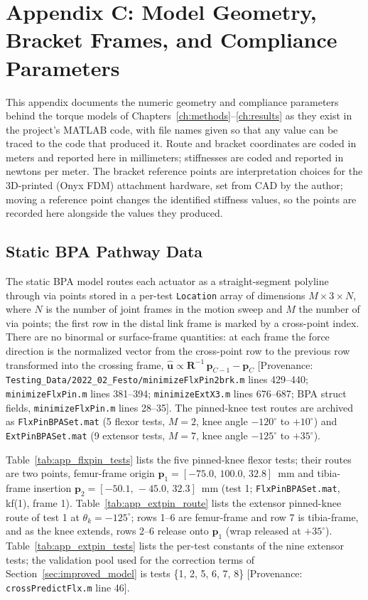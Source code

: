 \chapter{Appendix C: Model Geometry, Bracket Frames, and Compliance Parameters}\label{app:model_geometry}

This appendix documents the numeric geometry and compliance parameters behind the torque models of Chapters~\ref{ch:methods}--\ref{ch:results} as they exist in the project's MATLAB code, with file names given so that any value can be traced to the code that produced it. Route and bracket coordinates are coded in meters and reported here in millimeters; stiffnesses are coded and reported in newtons per meter. The bracket reference points are interpretation choices for the 3D-printed (Onyx FDM) attachment hardware, set from CAD by the author; moving a reference point changes the identified stiffness values, so the points are recorded here alongside the values they produced.

\section{Static BPA Pathway Data}

The static BPA model routes each actuator as a straight-segment polyline through via points stored in a per-test \texttt{Location} array of dimensions $M\times3\times N$, where $N$ is the number of joint frames in the motion sweep and $M$ the number of via points; the first row in the distal link frame is marked by a cross-point index. There are no binormal or surface-frame quantities: at each frame the force direction is the normalized vector from the cross-point row to the previous row transformed into the crossing frame, $\hat{\mathbf{u}} \propto \mathbf{R}^{-1}\,\mathbf{p}_{C-1} - \mathbf{p}_{C}$ [Provenance: \texttt{Testing\_Data/2022\_02\_Festo/minimizeFlxPin2brk.m} lines 429--440; \texttt{minimizeFlxPin.m} lines 381--394; \texttt{minimizeExtX3.m} lines 676--687; BPA struct fields, \texttt{minimizeFlxPin.m} lines 28--35]. The pinned-knee test routes are archived as \texttt{FlxPinBPASet.mat} (5 flexor tests, $M=2$, knee angle $-120^{\circ}$ to $+10^{\circ}$) and \texttt{ExtPinBPASet.mat} (9 extensor tests, $M=7$, knee angle $-125^{\circ}$ to $+35^{\circ}$).

Table~\ref{tab:app_flxpin_tests} lists the five pinned-knee flexor tests; their routes are two points, femur-frame origin $\mathbf{p}_{1} = [-75.0,\,100.0,\,32.8]$~mm and tibia-frame insertion $\mathbf{p}_{2} = [-50.1,\,-45.0,\,32.3]$~mm (test 1; \texttt{FlxPinBPASet.mat}, kf(1), frame 1). Table~\ref{tab:app_extpin_route} lists the extensor pinned-knee route of test 1 at $\theta_{k}=-125^{\circ}$; rows 1--6 are femur-frame and row 7 is tibia-frame, and as the knee extends, rows 2--6 release onto $\mathbf{p}_{1}$ (wrap released at $+35^{\circ}$). Table~\ref{tab:app_extpin_tests} lists the per-test constants of the nine extensor tests; the validation pool used for the correction terms of Section~\ref{sec:improved_model} is tests \{1, 2, 5, 6, 7, 8\} [Provenance: \texttt{crossPredictFlx.m} line 46].

